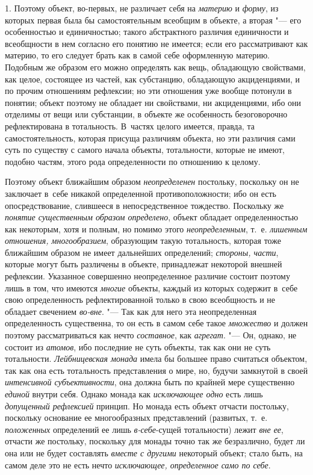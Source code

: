 1. Поэтому объект, во-первых, не различает себя на {\em материю} и
{\em форму}, из которых первая была бы самостоятельным всеобщим в объекте,
а вторая "--- его особенностью и единичностью; такого абстрактного
различия единичности и всеобщности в нем согласно его понятию не имеется;
если его рассматривают как материю, то его следует брать как в самой себе
оформленную материю. Подобным же образом его можно определять как вещь,
обладающую свойствами, как целое, состоящее из частей, как субстанцию,
обладающую акциденциями, и по прочим отношениям рефлексии; но эти отношения
уже вообще потонули в понятии; объект поэтому не обладает ни свойствами, ни
акциденциями, ибо они отделимы от вещи или субстанции, в объекте же
особенность безоговорочно рефлектирована в тотальность. В~частях целого
имеется, правда, та самостоятельность, которая присуща различиям объекта,
но эти различия сами суть по существу с самого начала объекты, тотальности,
которые не имеют, подобно частям, этого рода определенности по отношению к
целому.

Поэтому объект ближайшим образом {\em неопределенен}
постольку, поскольку он не заключает в~себе никакой
определенной противоположности; ибо он есть опосредствование, слившееся в
непосредственное тождество. Поскольку же {\em понятие существенным образом
определено}, объект обладает определенностью как некоторым,
хотя и полным, но помимо этого {\em неопределенным},
т.~е. {\em лишенным отношения, многообразием}, образующим такую тотальность,
которая тоже ближайшим образом не имеет дальнейших определений;
{\em стороны, части},
которые могут быть различены в объекте, принадлежат некоторой
внешней рефлексии. Указанное совершенно неопределенное различие состоит
поэтому лишь в том, что имеются {\em многие} объекты,
каждый из которых содержит в~себе свою определенность рефлектированной
только в свою всеобщность и не обладает свечением {\em во-вне}. "--- Так как
для него эта неопределенная определенность существенна, то он есть в самом
себе такое {\em множество} и должен поэтому рассматриваться как нечто
{\em составное}, как {\em агрегат}. "--- Он,
однако, не состоит из {\em атомов},
ибо последние не суть объекты, так как они не суть
тотальности. {\em Лейбницевская монада}
имела бы большее право считаться объектом, так как она есть
тотальность представления о мире, но, будучи замкнутой в своей
{\em интенсивной субъективности}, она должна быть по крайней мере существенно
{\em единой} внутри себя. Однако монада как {\em исключающее
одно} есть лишь {\em допущенный рефлексией}
принцип. Но монада есть объект отчасти постольку, поскольку
основание ее многообразных представлений (развитых, т.~е.
{\em положенных} определений ее лишь {\em в-себе}-сущей
тотальности) лежит {\em вне ее},
отчасти же постольку, поскольку для монады точно так же
безразлично, будет ли она или не будет составлять {\em вместе с другими}
некоторый объект; стало быть, на самом деле это не есть нечто
{\em исключающее, определенное само по себе}.

